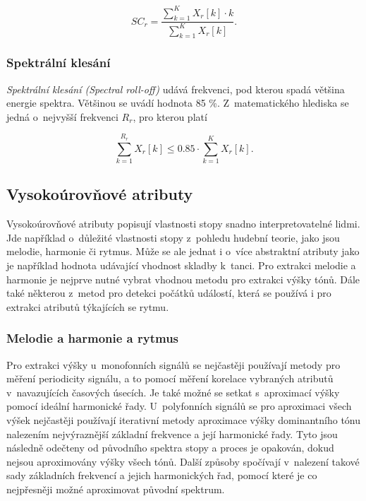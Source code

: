 \begin{equation}
	SC_r = \frac{\sum\limits_{k=1}^{K} X_r[k] \cdot k}{\sum\limits_{k=1}^{K} X_r[k]}.
\end{equation}
\cite{low_level}\cite{mgc}\cite{mircom}\cite{aca}

\subsubsection*{Spektrální klesání}
\textit{Spektrální klesání (Spectral roll-off)} udává frekvenci, pod kterou spadá většina energie spektra. Většinou se uvádí hodnota 85 \%. Z~matematického hlediska se jedná o~nejvyšší frekvenci $R_r$, pro kterou platí

\begin{equation}
	\sum\limits_{k=1}^{R_r} X_r[k] \leq 0.85 \cdot \sum\limits_{k=1}^{K} X_r[k].
\end{equation}
\cite{low_level}\cite{mgc}\cite{mircom}\cite{aca}

\subsection*{Vysokoúrovňové atributy}
\label{vysokourovnove_atributy}
Vysokoúrovňové atributy popisují vlastnosti stopy snadno interpretovatelné lidmi. Jde například o~důležité vlastnosti stopy z~pohledu hudební teorie, jako jsou melodie, harmonie či rytmus. Může se ale jednat i o~více abstraktní atributy jako je například hodnota udávající vhodnost skladby k~tanci. Pro extrakci melodie a harmonie je nejprve nutné vybrat vhodnou metodu pro extrakci výšky tónů. Dále také některou z~metod pro detekci počátků událostí, která se používá i pro extrakci atributů týkajících se rytmu.\cite{MIR}\cite{aca}

\subsubsection*{Melodie a harmonie a rytmus}
\label{melodie_a_harmonie_a_rytmus}
Pro extrakci výšky u~monofonních signálů se nejčastěji používají metody pro měření periodicity signálu, a to pomocí měření korelace vybraných atributů v~navazujících časových úsecích. Je také možné se setkat s~aproximací výšky pomocí ideální harmonické řady. U~polyfonních signálů se pro aproximaci všech výšek nejčastěji používají iterativní metody aproximace výšky dominantního tónu nalezením nejvýraznější základní frekvence a její harmonické řady. Tyto jsou následně odečteny od původního spektra stopy a proces je opakován, dokud nejsou aproximovány výšky všech tónů. Další způsoby spočívají v~nalezení takové sady základních frekvencí a jejich harmonických řad, pomocí které je co nejpřesněji možné aproximovat původní spektrum.\cite{MIR}\cite{low_level}\cite{aca}

